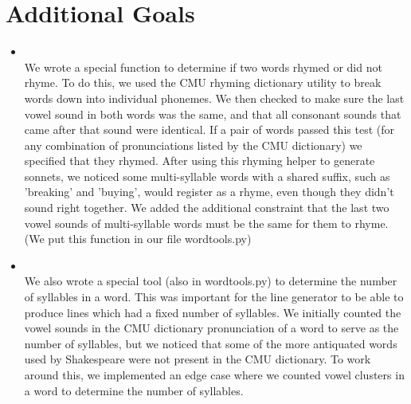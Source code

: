 \section{Additional Goals}
\medskip
\begin{itemize}


    \item {} \\

        We wrote a special function to determine if two words rhymed or did not rhyme. To do this, we used the CMU rhyming dictionary utility to break words down into individual phonemes. We then checked to make sure the last vowel sound in both words was the same, and that all consonant sounds that came after that sound were identical. If a pair of words passed this test (for any combination of pronunciations listed by the CMU dictionary) we specified that they rhymed. After using this rhyming helper to generate sonnets, we noticed some multi-syllable words with a shared suffix, such as 'breaking' and 'buying', would register as a rhyme, even though they didn't sound right together. We added the additional constraint that the last two vowel sounds of multi-syllable words must be the same for them to rhyme. (We put this function in our file wordtools.py)

    \item {} \\

        We also wrote a special tool (also in wordtools.py) to determine the number of syllables in a word. This was important for the line generator to be able to produce lines which had a fixed number of syllables. We initially counted the vowel sounds in the CMU dictionary pronunciation of a word to serve as the number of syllables, but we noticed that some of the more antiquated words used by Shakespeare were not present in the CMU dictionary. To work around this, we implemented an edge case where we counted vowel clusters in a word to determine the number of syllables.



\end{itemize}



